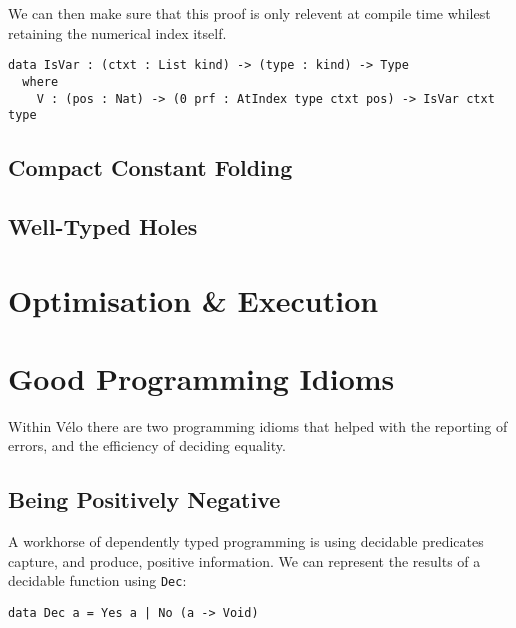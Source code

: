 \documentclass[%
draft,
a4paper,
UKenglish,
cleveref,
autoref,
thm-restate,
pdfa
]{oasics-v2021}
\newcommand{\Velo}{V{\'e}lo\xspace}
\begin{document}
We can then make sure that this proof is only relevent at compile time whilest retaining the numerical index itself.

\begin{verbatim}
data IsVar : (ctxt : List kind) -> (type : kind) -> Type
  where
    V : (pos : Nat) -> (0 prf : AtIndex type ctxt pos) -> IsVar ctxt type
\end{verbatim}

\subsection{Compact Constant Folding}
\label{sec:design:constants}


\subsection{Well-Typed Holes}
\label{sec:design:holes}


\section{Optimisation \& Execution}
\label{sec:compiler}



\section{Good Programming Idioms}
\label{sec:idioms}

Within \Velo{} there are two programming idioms that helped with the reporting of errors, and the efficiency of deciding equality.

\subsection{Being Positively Negative}
\label{sec:idioms:posneg}

A workhorse of dependently typed programming is using decidable predicates capture, and produce, positive information.
We can represent the results of a decidable function using \texttt{Dec}:

\begin{verbatim}
data Dec a = Yes a | No (a -> Void)
\end{verbatim}
\end{document}
